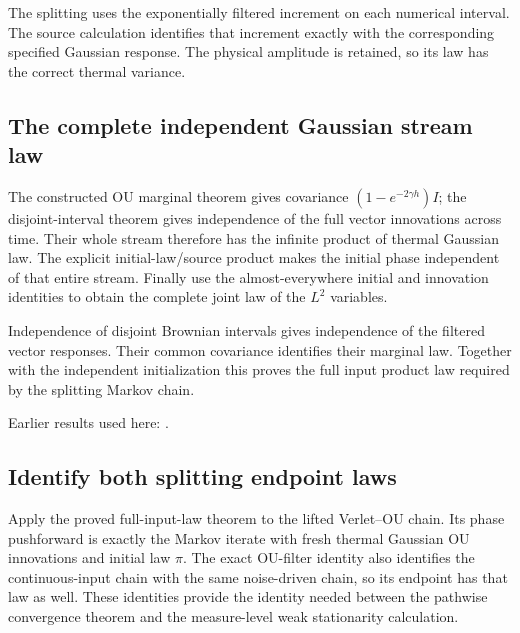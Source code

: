 \documentclass[11pt,a4paper]{report}
\begin{document}
The splitting uses the exponentially filtered increment on each numerical interval. The source calculation identifies that increment exactly with the corresponding specified Gaussian response. The physical amplitude is retained, so its law has the correct thermal variance.

\subsection{\texorpdfstring{The complete independent Gaussian stream law}{The complete independent Gaussian stream law}}
\label{report-step-KineticLangevin-CanonicalProduct-lean-4}


The constructed OU marginal theorem gives covariance \((1-e^{-2\gamma h})I\); the disjoint-interval theorem gives independence of the full vector innovations across time. Their whole stream therefore has the infinite product of thermal Gaussian law. The explicit initial-law/\allowbreak{}source product makes the initial phase independent of that entire stream. Finally use the almost-everywhere initial and innovation identities to obtain the complete joint law of the \(L^{2}\) variables.



Independence of disjoint Brownian intervals gives independence of the filtered vector responses. Their common covariance identifies their marginal law. Together with the independent initialization this proves the full input product law required by the splitting Markov chain.



Earlier results used here: \cite[Section~3.8.17]{LangevinLean2026ULASC}.
\subsection{\texorpdfstring{Identify both splitting endpoint laws}{Identify both splitting endpoint laws}}
\label{report-step-KineticLangevin-CanonicalProduct-lean-5}


Apply the proved full-input-law theorem to the lifted Verlet–OU chain. Its phase pushforward is exactly the Markov iterate with fresh thermal Gaussian OU innovations and initial law \(\pi\). The exact OU-filter identity also identifies the continuous-input chain with the same noise-driven chain, so its endpoint has that law as well. These identities provide the identity needed between the pathwise convergence theorem and the measure-level weak stationarity calculation.
\end{document}
